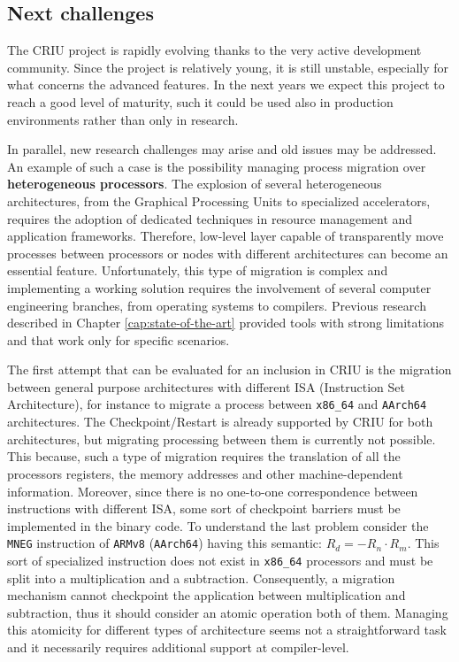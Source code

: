 \subsection{Next challenges}
The CRIU project is rapidly evolving thanks to the very active development
community. Since the project is relatively young, it is still unstable,
especially for what concerns the advanced features. In the next years we
expect this project to reach a good level of maturity, such it could be used
also in production environments rather than only in research.

In parallel, new research challenges may arise and old issues may be addressed.
An example of such a case is the possibility managing process migration over
\textbf{heterogeneous processors}. The
explosion of several heterogeneous architectures, from the Graphical Processing
Units to specialized accelerators, requires the adoption of dedicated
techniques
in resource management and application frameworks. Therefore, low-level layer
capable of transparently move processes between processors or nodes with
different
architectures can become an essential feature. Unfortunately, this type of migration is
complex and implementing a working solution requires the involvement of several
computer engineering branches, from operating systems to compilers.
Previous research described in Chapter
\ref{cap:state-of-the-art} provided tools with strong limitations and that work
only for specific scenarios.

The first attempt that can be evaluated for an inclusion in CRIU is the
migration between general purpose architectures with different ISA 
(Instruction Set Architecture), for
instance to migrate a process between \texttt{x86\_64} and \texttt{AArch64}
architectures. The Checkpoint/Restart is already supported by CRIU for both architectures, but migrating processing between them is currently not possible. This because, such a type of migration
requires the translation of all the processors registers, the memory addresses
and other machine-dependent information. Moreover, since there is no one-to-one
correspondence between instructions with different ISA, some sort of
checkpoint barriers must be implemented in the binary code. To understand the
last problem consider the \texttt{MNEG} instruction of \texttt{ARMv8}
(\texttt{AArch64}) having this semantic: \( R_d = -R_n \cdot R_m\). This sort
of specialized instruction does not exist in \texttt{x86\_64} processors and
must be split into a multiplication and a subtraction. Consequently, a
migration mechanism cannot checkpoint the application between multiplication
and subtraction, thus it should consider an atomic operation both of them.
Managing this atomicity for different types of architecture seems not a
straightforward task and it necessarily requires additional support at compiler-level.


